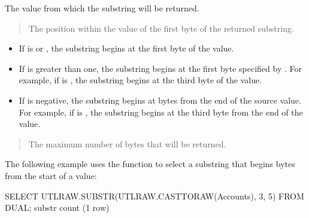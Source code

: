 \documentclass[letterpaper,10pt,english,openany,oneside]{sphinxmanual}
\begin{document}

The  value from which the substring will be returned.

\begin{quote}

The position within the  value of the first byte of the returned
substring.
\end{quote}
\begin{itemize}
\item {} 
If  is  or , the substring begins at the first byte of the 
value.

\item {} 
If  is greater than one, the substring begins at the first byte
specified by . For example, if  is , the substring
begins at the third byte of the value.

\item {} 
If  is negative, the substring begins at  bytes from the
end of the source value. For example, if  is , the
substring begins at the third byte from the end of the value.

\end{itemize}

\begin{quote}

The maximum number of bytes that will be returned.
\end{quote}


The following example uses the  function to select a substring
that begins  bytes from the start of a  value:

%
\begin{sphinxVerbatim}[commandchars=\\\{\}]
SELECT UTL\PYGZus{}RAW.SUBSTR(UTL\PYGZus{}RAW.CAST\PYGZus{}TO\PYGZus{}RAW(\PYGZsq{}Accounts\PYGZsq{}), 3, 5) FROM DUAL;
 substr
 \PYGZhy{}\PYGZhy{}\PYGZhy{}\PYGZhy{}\PYGZhy{}\PYGZhy{}\PYGZhy{}\PYGZhy{}
 count
 (1 row)
\end{sphinxVerbatim}
\end{document}
